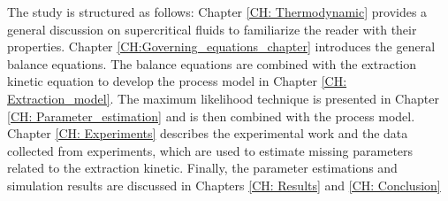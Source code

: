 \documentclass[../Article_Model_Parameters.tex]{subfiles}
\begin{document}
	The study is structured as follows: Chapter \ref{CH: Thermodynamic} provides a general discussion on supercritical fluids to familiarize the reader with their properties. Chapter \ref{CH:Governing_equations_chapter} introduces the general balance equations. The balance equations are combined with the extraction kinetic equation to develop the process model in Chapter \ref{CH: Extraction_model}. The maximum likelihood technique is presented in Chapter \ref{CH: Parameter_estimation} and is then combined with the process model. Chapter \ref{CH: Experiments} describes the experimental work and the data collected from experiments, which are used to estimate missing parameters related to the extraction kinetic. Finally, the parameter estimations and simulation results are discussed in Chapters \ref{CH: Results} and \ref{CH: Conclusion}
		
\end{document}
